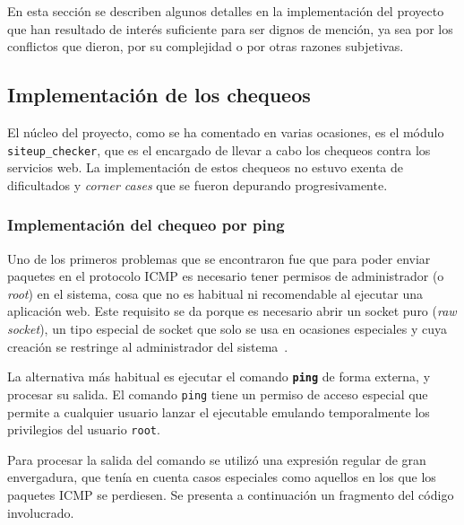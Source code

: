 En esta sección se describen algunos detalles en la implementación del proyecto
que han resultado de interés suficiente para ser dignos de mención, ya sea por
los conflictos que dieron, por su complejidad o por otras razones subjetivas.

\subsection{Implementación de los chequeos}

El núcleo del proyecto, como se ha comentado en varias ocasiones, es el módulo
\texttt{siteup\_checker}, que es el encargado de llevar a cabo los chequeos
contra los servicios web. La implementación de estos chequeos no estuvo exenta
de dificultados y \textit{corner cases} que se fueron depurando progresivamente.

\subsubsection{Implementación del chequeo por ping}

Uno de los primeros problemas que se encontraron fue que para poder enviar
paquetes en el protocolo ICMP es necesario tener permisos de administrador (o
\textit{root}) en el sistema, cosa que no es habitual ni recomendable al
ejecutar una aplicación web. Este requisito se da porque es necesario abrir un
socket puro (\textit{raw socket}), un tipo especial de socket que solo se usa en
ocasiones especiales y cuya creación se restringe al administrador del
sistema~\cite{linux_man_capabilities}.

La alternativa más habitual es ejecutar el comando \textbf{\texttt{ping}} de
forma externa, y procesar su salida. El comando \texttt{ping} tiene un permiso
de acceso especial que permite a cualquier usuario lanzar el ejecutable emulando
temporalmente los privilegios del usuario \texttt{root}.

Para procesar la salida del comando se utilizó una expresión regular de gran
envergadura, que tenía en cuenta casos especiales como aquellos en los que los
paquetes ICMP se perdiesen. Se presenta a continuación un fragmento del código involucrado.


